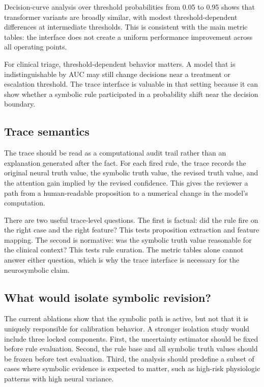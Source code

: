 \documentclass{article}
\begin{document}
Decision-curve analysis over threshold probabilities from 0.05 to 0.95 shows that transformer variants are broadly similar, with modest threshold-dependent differences at intermediate thresholds. This is consistent with the main metric tables: the interface does not create a uniform performance improvement across all operating points.

For clinical triage, threshold-dependent behavior matters. A model that is indistinguishable by AUC may still change decisions near a treatment or escalation threshold. The trace interface is valuable in that setting because it can show whether a symbolic rule participated in a probability shift near the decision boundary.

\subsection{Trace semantics}

The trace should be read as a computational audit trail rather than an explanation generated after the fact. For each fired rule, the trace records the original neural truth value, the symbolic truth value, the revised truth value, and the attention gain implied by the revised confidence. This gives the reviewer a path from a human-readable proposition to a numerical change in the model's computation.

There are two useful trace-level questions. The first is factual: did the rule fire on the right case and the right feature? This tests proposition extraction and feature mapping. The second is normative: was the symbolic truth value reasonable for the clinical context? This tests rule curation. The metric tables alone cannot answer either question, which is why the trace interface is necessary for the neurosymbolic claim.

\subsection{What would isolate symbolic revision?}

The current ablations show that the symbolic path is active, but not that it is uniquely responsible for calibration behavior. A stronger isolation study would include three locked components. First, the uncertainty estimator should be fixed before rule evaluation. Second, the rule base and all symbolic truth values should be frozen before test evaluation. Third, the analysis should predefine a subset of cases where symbolic evidence is expected to matter, such as high-risk physiologic patterns with high neural variance.
\end{document}
